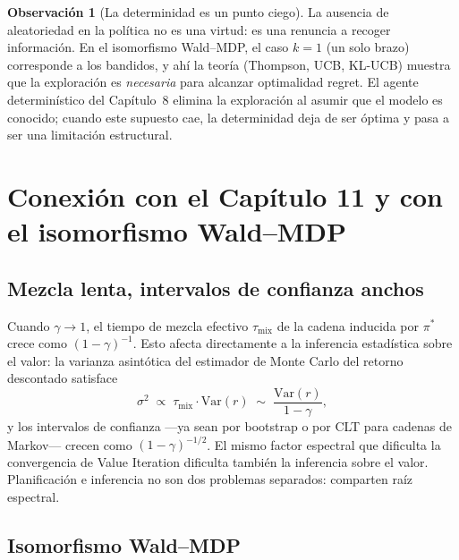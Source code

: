 \documentclass[12pt, a4paper]{article}
\theoremstyle{plain}
\theoremstyle{definition}
\newtheorem{remark}[theorem]{Observación}
\begin{document}
\begin{remark}[La determinidad es un punto ciego]
\label{rem:determinidad}
La ausencia de aleatoriedad en la política no es una virtud: es una
renuncia a recoger información. En el isomorfismo Wald--MDP, el caso
$k=1$ (un solo brazo) corresponde a los bandidos, y ahí la teoría
(Thompson, UCB, KL-UCB) muestra que la exploración es \emph{necesaria}
para alcanzar optimalidad regret. El agente determinístico del
Capítulo~8 elimina la exploración al asumir que el modelo es conocido;
cuando este supuesto cae, la determinidad deja de ser óptima y pasa a
ser una limitación estructural.
\end{remark}

\section{Conexión con el Capítulo 11 y con el isomorfismo Wald--MDP}
\label{sec:conexion}

\subsection{Mezcla lenta, intervalos de confianza anchos}

Cuando $\gamma\to 1$, el tiempo de mezcla efectivo
$\tau_{\mathrm{mix}}$ de la cadena inducida por $\pi^{*}$ crece como
$(1-\gamma)^{-1}$. Esto afecta directamente a la inferencia estadística
sobre el valor: la varianza asintótica del estimador de Monte Carlo del
retorno descontado satisface
\[
  \sigma^2
  \;\propto\;\tau_{\mathrm{mix}}\cdot\mathrm{Var}(r)
  \;\sim\;\frac{\mathrm{Var}(r)}{1-\gamma},
\]
y los intervalos de confianza ---ya sean por bootstrap o por CLT para
cadenas de Markov--- crecen como $(1-\gamma)^{-1/2}$. El mismo factor
espectral que dificulta la convergencia de Value Iteration dificulta
también la inferencia sobre el valor. Planificación e inferencia no son
dos problemas separados: comparten raíz espectral.

\subsection{Isomorfismo Wald--MDP}
\end{document}
